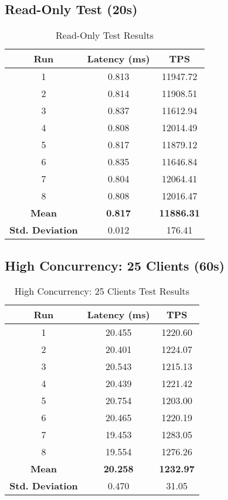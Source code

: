 \subsection{Read-Only Test (20s)}
\begin{table}[H]
\centering
\begin{tabular}{|c|c|c|}
\hline
\textbf{Run} & \textbf{Latency (ms)} & \textbf{TPS} \\
\hline
1 & 0.813 & 11947.72 \\
2 & 0.814 & 11908.51 \\
3 & 0.837 & 11612.94 \\
4 & 0.808 & 12014.49 \\
5 & 0.817 & 11879.12 \\
6 & 0.835 & 11646.84 \\
7 & 0.804 & 12064.41 \\
8 & 0.808 & 12016.47 \\
\hline
\textbf{Mean} & \textbf{0.817} & \textbf{11886.31} \\
\textbf{Std. Deviation} & 0.012 & 176.41 \\
\hline
\end{tabular}
\caption{Read-Only Test Results}
\end{table}

\subsection{High Concurrency: 25 Clients (60s)}
\begin{table}[H]
\centering
\begin{tabular}{|c|c|c|}
\hline
\textbf{Run} & \textbf{Latency (ms)} & \textbf{TPS} \\
\hline
1 & 20.455 & 1220.60 \\
2 & 20.401 & 1224.07 \\
3 & 20.543 & 1215.13 \\
4 & 20.439 & 1221.42 \\
5 & 20.754 & 1203.00 \\
6 & 20.465 & 1220.19 \\
7 & 19.453 & 1283.05 \\
8 & 19.554 & 1276.26 \\
\hline
\textbf{Mean} & \textbf{20.258} & \textbf{1232.97} \\
\textbf{Std. Deviation} & 0.470 & 31.05 \\
\hline
\end{tabular}
\caption{High Concurrency: 25 Clients Test Results}
\end{table}

